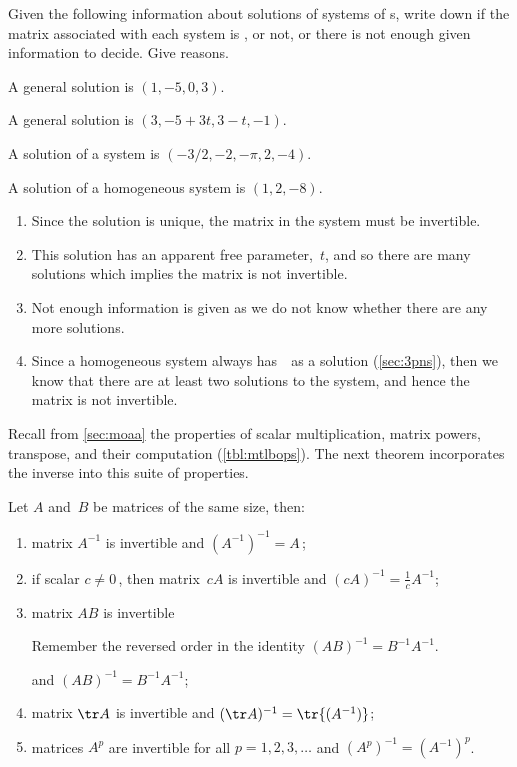 \begin{example} \label{eg:}
Given the following information about solutions of systems of s, write down if the matrix associated with each system is , or not, or there is not enough given information to decide.  Give reasons.
\begin{parts}
\item A general solution is \((1,-5,0,3)\).
\item A general solution is \((3,-5+3t,3-t,-1)\).
\item A solution of a system is \((-3/2,-2,-\pi,2,-4)\).
\item A solution of a homogeneous system is \((1,2,-8)\).
\end{parts}
\begin{solution} 
\begin{enumerate}
\item Since the solution is unique, the matrix in the system must be invertible.
\item This solution has an apparent free parameter,~\(t\), and so there are many solutions which implies the matrix is not invertible.
\item Not enough information is given as we do not know whether there are any more solutions.
\item Since a homogeneous system always has~\ov\ as a solution (\autoref{sec:3pns}), then we know that there are at least two solutions to the system, and hence the matrix is not invertible.
\end{enumerate}
\end{solution}
\end{example}




Recall from \autoref{sec:moaa} the properties of scalar multiplication, matrix powers, transpose, and their computation (\autoref{tbl:mtlbops}).
The next theorem incorporates the inverse into this suite of properties.


\begin{theorem} \label{thm:invprop} 
Let \(A\) and~\(B\) be  matrices of the same size, then:
\begin{enumerate}
\item\label{thm:invpropa}  matrix \(A^{-1}\) is invertible and \((A^{-1})^{-1}=A\)\,;
\item\label{thm:invpropb} if scalar \(c\neq0\)\,, then matrix~\(cA\) is invertible and \((cA)^{-1}=\frac1cA^{-1}\);
\item\label{thm:invpropc} 
matrix \(AB\) is invertible\begin{aside}
Remember the reversed order in the identity $(AB)^{-1}=B^{-1}A^{-1}$.
\end{aside} 
and \((AB)^{-1}=B^{-1}A^{-1}\);
\item\label{thm:invpropd} matrix \(\tr A\) is invertible and \((\tr A)^{-1}=\tr{(A^{-1})}\);
\item\label{thm:invprope} matrices \(A^p\) are invertible for all \(p=1,2,3,\ldots\) and \((A^p)^{-1}=(A^{-1})^p\).
\end{enumerate}
\end{theorem}


